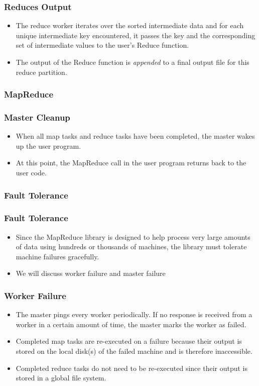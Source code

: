 \documentclass{beamer}
\begin{document}
\begin{frame}
  \frametitle{Reduces Output}
  \begin{itemize}
    \item The reduce worker iterates over the sorted intermediate data
      and for each unique intermediate key encountered, it passes the
      key and the corresponding set of intermediate values to the
      user’s Reduce function. 
    \item The output of the Reduce function is {\em appended} to a
      final output file for this reduce partition.
  \end{itemize}
\end{frame}

\begin{frame}
\frametitle{MapReduce}
\centerline{}
\end{frame}

\begin{frame}
  \frametitle{Master Cleanup}
  \begin{itemize}
    \item When all map tasks and reduce tasks have been completed, the
      master wakes up the user program.  
    \item At this point, the MapReduce call in the user program
      returns back to the user code.
  \end{itemize}
\end{frame}

\subsubsection{Fault Tolerance}

\begin{frame}
  \frametitle{Fault Tolerance}
  \begin{itemize}
    \item Since the MapReduce library is designed to help process very
      large amounts of data using hundreds or thousands of machines,
      the library must tolerate machine failures gracefully.
    \item We will discuss worker failure and master failure
  \end{itemize}
\end{frame}

\begin{frame}
  \frametitle{Worker Failure}
  \begin{itemize}
    \item The master pings every worker periodically. If no response
      is received from a worker in a certain amount of time, the
      master marks the worker as failed.
    \item Completed map tasks are re-executed on a failure because
      their output is stored on the local disk(s) of the failed
      machine and is therefore inaccessible.
    \item Completed reduce tasks do not need to be re-executed since
      their output is stored in a global file system.
  \end{itemize}
\end{frame}
\end{document}
